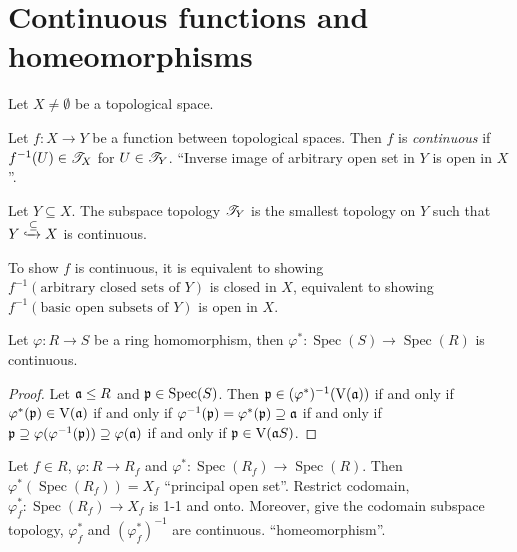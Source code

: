 \section*{Continuous functions and homeomorphisms}

Let $X \neq \emptyset$ be a topological space. 

\begin{definition}
    Let $f: X \to Y$ be a function between topological spaces. Then $f$ is \emph{continuous} if $f^{-1}(U) \in \mathscr{T}_X$ for $U \in \mathscr{T}_Y$. ``Inverse image of arbitrary open set in $Y$ is open in $X$''. 
\end{definition}

\begin{remark}
    Let $Y \subseteq X$. The subspace topology $\mathscr{T}_Y$ is the smallest topology on $Y$ such that $Y \xhookrightarrow \subseteq X$ is continuous. \par 
\end{remark}

\begin{fact}
    To show $f$ is continuous, it is equivalent to showing $f^{-1}(\text{arbitrary closed sets of $Y$})$ is closed in $X$, equivalent to showing $f^{-1}(\text{basic open subsets of $Y$})$ is open in $X$.
\end{fact}

\begin{theorem}
    Let $\varphi: R \to S$ be a ring homomorphism, then $\varphi^*: \operatorname{Spec}(S) \to \operatorname{Spec}(R)$ is continuous. 
\end{theorem}

\begin{proof}
    Let $\mathfrak{a} \leq R$ and $\mathfrak{p} \in \operatorname{Spec}(S)$. Then $\mathfrak{p} \in (\varphi^*)^{-1}(\operatorname{V}(\mathfrak{a}))$ if and only if $\varphi^*(\mathfrak{p}) \in \operatorname{V}(\mathfrak{a})$ if and only if $\varphi^{-1}(\mathfrak{p}) = \varphi^*(\mathfrak{p}) \supseteq \mathfrak{a}$ if and only if $\mathfrak{p} \supseteq \varphi(\varphi^{-1}(\mathfrak{p})) \supseteq \varphi(\mathfrak{a})$ if and only if $\mathfrak{p} \in \operatorname{V}(\mathfrak{a} S)$.
\end{proof}

\begin{theorem}
    Let $f \in R$, $\varphi: R \to R_f$ and $\varphi^*: \operatorname{Spec}(R_f) \to \operatorname{Spec}(R)$. Then  $\varphi^*(\operatorname{Spec}(R_f)) = X_f$ ``principal open set''. Restrict codomain, $\varphi_f^*: \operatorname{Spec}(R_f) \to X_f$ is 1-1 and onto. Moreover, give the codomain subspace topology, $\varphi_f^*$ and $(\varphi_f^*)^{-1}$ are continuous. ``homeomorphism''. 
\end{theorem}

